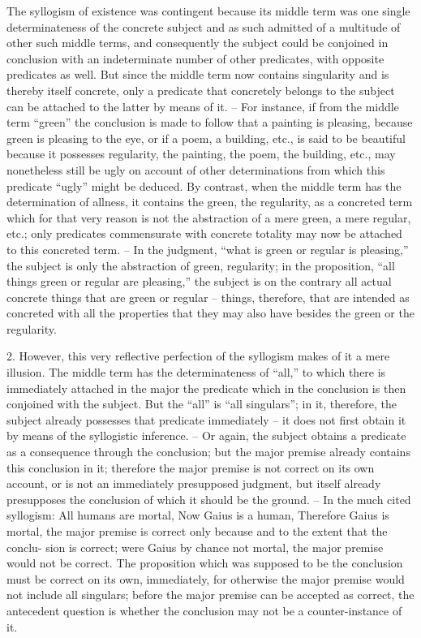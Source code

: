 The syllogism of existence was contingent because its middle term was
one single determinateness of the concrete subject and as such admitted
of a multitude of other such middle terms, and consequently the subject
could be conjoined in conclusion with an indeterminate number of other
predicates, with opposite predicates as well. But since the middle term
now contains singularity and is thereby itself concrete, only a predicate that
concretely belongs to the subject can be attached to the latter by means of
it. – For instance, if from the middle term “green” the conclusion is made to
follow that a painting is pleasing, because green is pleasing to the eye, or if a
poem, a building, etc., is said to be beautiful because it possesses regularity,
the painting, the poem, the building, etc., may nonetheless still be ugly on
account of other determinations from which this predicate “ugly” might
be deduced. By contrast, when the middle term has the determination of
allness, it contains the green, the regularity, as a concreted term which for
that very reason is not the abstraction of a mere green, a mere regular, etc.;
only predicates commensurate with concrete totality may now be attached to
this concreted term. – In the judgment, “what is green or regular is pleasing,”
the subject is only the abstraction of green, regularity; in the proposition,
“all things green or regular are pleasing,” the subject is on the contrary all
actual concrete things that are green or regular – things, therefore, that are
intended as concreted with all the properties that they may also have besides
the green or the regularity.

2. However, this very reflective perfection of the syllogism makes of
it a mere illusion. The middle term has the determinateness of “all,” to
which there is immediately attached in the major the predicate which in the
conclusion is then conjoined with the subject. But the “all” is “all singulars”;
in it, therefore, the subject already possesses that predicate immediately –
it does not first obtain it by means of the syllogistic inference. – Or again,
the subject obtains a predicate as a consequence through the conclusion;
but the major premise already contains this conclusion in it; therefore the
major premise is not correct on its own account, or is not an immediately
presupposed judgment, but itself already presupposes the conclusion of which
it should be the ground. – In the much cited syllogism:
All humans are mortal,
Now Gaius is a human,
Therefore Gaius is mortal,
the major premise is correct only because and to the extent that the conclu-
sion is correct; were Gaius by chance not mortal, the major premise would
not be correct. The proposition which was supposed to be the conclusion
must be correct on its own, immediately, for otherwise the major premise
would not include all singulars; before the major premise can be accepted
as correct, the antecedent question is whether the conclusion may not be a
counter-instance of it.

